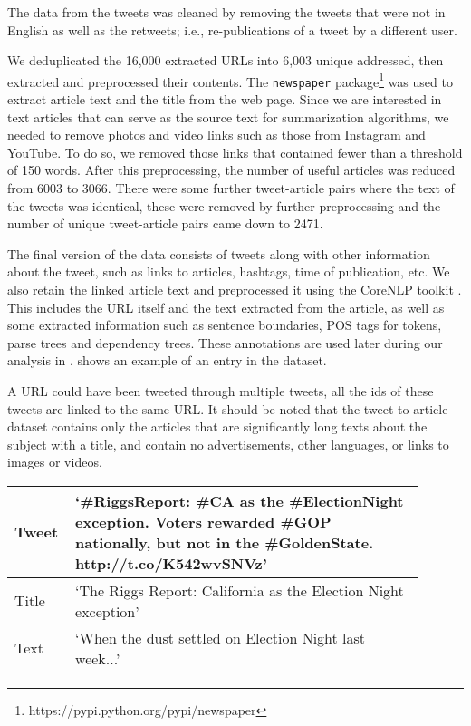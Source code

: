 The data from the tweets was cleaned by removing the tweets that were not in English as well as the retweets; i.e., re-publications of a tweet by a different user.

We deduplicated the 16,000 extracted URLs into 6,003 unique addressed, then extracted and preprocessed their contents. The \texttt{newspaper} package\footnote{https://pypi.python.org/pypi/newspaper} was used to extract article text and the title from the web page. Since we are interested in text articles that can serve as the source text for summarization algorithms, we needed to remove photos and video links such as those from Instagram and YouTube. To do so, we removed those links that contained fewer than a threshold of 150 words. After this preprocessing, the number of useful articles was reduced from 6003 to 3066. There were some further tweet-article pairs where the text of the tweets was identical, these were removed by further preprocessing and the number of unique tweet-article pairs came down to 2471. 

The final version of the data consists of tweets along with other information about the tweet, such as links to articles, hashtags, time of publication, etc. We also retain the linked article text and preprocessed it using the CoreNLP toolkit \cite{manning2014stanford}. This includes the URL itself and the text extracted from the article, as well as some extracted information such as sentence boundaries, POS tags for tokens, parse trees and dependency trees. These annotations are used later during our analysis in .  shows an example of an entry in the dataset.

A URL could have been tweeted through multiple tweets, all the ids of these tweets are linked to the same URL. It should be noted that the tweet to article dataset contains only the articles that are significantly long texts about the subject with a title, and contain no advertisements, other languages, or links to images or videos. 


\begin{table}[htbp]
\centering
\begin{tabular}{|p{0.1\linewidth}|p{0.8\linewidth}|}
\hline
Tweet & `\#RiggsReport: \#CA as the \#ElectionNight exception. Voters rewarded \#GOP nationally, but not in the \#GoldenState. http://t.co/K542wvSNVz' \\ \hline
Title & `The Riggs Report: California as the Election Night exception'                                                                                 \\ \hline
Text  & `When the dust settled on Election Night last week...'                                                                                         \\ \hline
\end{tabular}
\label{tab:ex1}
\end{table}